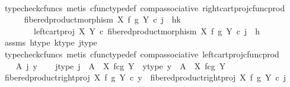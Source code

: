 \begin{isabellebody}
\ \ \ \ \ \ \isamarkupfalse%
\ {\isacharparenleft}{\kern0pt}typecheck{\isacharunderscore}{\kern0pt}cfuncs{\isacharcomma}{\kern0pt}\ metis\ cfunc{\isacharunderscore}{\kern0pt}type{\isacharunderscore}{\kern0pt}def\ comp{\isacharunderscore}{\kern0pt}associative\ right{\isacharunderscore}{\kern0pt}cart{\isacharunderscore}{\kern0pt}proj{\isacharunderscore}{\kern0pt}cfunc{\isacharunderscore}{\kern0pt}prod{\isacharparenright}{\kern0pt}\isanewline
\isanewline
\ \ \ \ \isamarkupfalse%
\ {\isachardoublequoteopen}fibered{\isacharunderscore}{\kern0pt}product{\isacharunderscore}{\kern0pt}morphism\ X\ f\ g\ Y\ {\isasymcirc}\isactrlsub c\ j\ {\isacharequal}{\kern0pt}\ {\isasymlangle}h{\isacharcomma}{\kern0pt}k{\isasymrangle}\ {\isasymLongrightarrow}\isanewline
\ \ \ \ \ \ \ \ {\isacharparenleft}{\kern0pt}left{\isacharunderscore}{\kern0pt}cart{\isacharunderscore}{\kern0pt}proj\ X\ Y\ {\isasymcirc}\isactrlsub c\ fibered{\isacharunderscore}{\kern0pt}product{\isacharunderscore}{\kern0pt}morphism\ X\ f\ g\ Y{\isacharparenright}{\kern0pt}\ {\isasymcirc}\isactrlsub c\ j\ {\isacharequal}{\kern0pt}\ h{\isachardoublequoteclose}\isanewline
\ \ \ \ \ \ \isamarkupfalse%
\ assms\ h{\isacharunderscore}{\kern0pt}type\ k{\isacharunderscore}{\kern0pt}type\ j{\isacharunderscore}{\kern0pt}type\isanewline
\ \ \ \ \ \ \isamarkupfalse%
\ {\isacharparenleft}{\kern0pt}typecheck{\isacharunderscore}{\kern0pt}cfuncs{\isacharcomma}{\kern0pt}\ metis\ cfunc{\isacharunderscore}{\kern0pt}type{\isacharunderscore}{\kern0pt}def\ comp{\isacharunderscore}{\kern0pt}associative\ left{\isacharunderscore}{\kern0pt}cart{\isacharunderscore}{\kern0pt}proj{\isacharunderscore}{\kern0pt}cfunc{\isacharunderscore}{\kern0pt}prod{\isacharparenright}{\kern0pt}\isanewline
\ \ \isamarkupfalse%
\isanewline
{}\isamarkupfalse%
\isanewline
\ \ \isamarkupfalse%
\ A\ j\ y\isanewline
\ \ \isamarkupfalse%
\ j{\isacharunderscore}{\kern0pt}type{\isacharcolon}{\kern0pt}\ {\isachardoublequoteopen}j\ {\isacharcolon}{\kern0pt}\ A\ {\isasymrightarrow}\ X\ \isactrlbsub f\isactrlesub {\isasymtimes}\isactrlsub c\isactrlbsub g\isactrlesub \ Y{\isachardoublequoteclose}\ \ y{\isacharunderscore}{\kern0pt}type{\isacharcolon}{\kern0pt}\ {\isachardoublequoteopen}y\ {\isacharcolon}{\kern0pt}\ A\ {\isasymrightarrow}\ X\ \isactrlbsub f\isactrlesub {\isasymtimes}\isactrlsub c\isactrlbsub g\isactrlesub \ Y{\isachardoublequoteclose}\isanewline
\ \ \isamarkupfalse%
\ {\isachardoublequoteopen}fibered{\isacharunderscore}{\kern0pt}product{\isacharunderscore}{\kern0pt}right{\isacharunderscore}{\kern0pt}proj\ X\ f\ g\ Y\ {\isasymcirc}\isactrlsub c\ y\ {\isacharequal}{\kern0pt}\ fibered{\isacharunderscore}{\kern0pt}product{\isacharunderscore}{\kern0pt}right{\isacharunderscore}{\kern0pt}proj\ X\ f\ g\ Y\ {\isasymcirc}\isactrlsub c\ j{\isachardoublequoteclose}\isanewline

\end{isabellebody}
